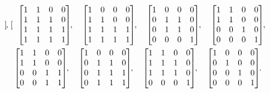 \documentclass[12pt]{amsart}
\theoremstyle{definition}
\numberwithin{equation}{section}
\newcommand{\ntksp}{\negthickspace}
\begin{document}
\begin{equation}
\begin{gathered}
\begin{bmatrix}
  \end{bmatrix}\ntksp,
  \quad
  \begin{bmatrix}
    1 & 1 & 0 & 0\\
    1 & 1 & 1 & 0\\
    1 & 1 & 1 & 1\\
    1 & 1 & 1 & 1
  \end{bmatrix}\ntksp,
  \quad
  \begin{bmatrix}
    1 & 0 & 0 & 0\\
    1 & 1 & 0 & 0\\
    1 & 1 & 1 & 1\\
    1 & 1 & 1 & 1
  \end{bmatrix}\ntksp,
  \quad
  \begin{bmatrix}
    1 & 0 & 0 & 0\\
    0 & 1 & 1 & 0\\
    0 & 1 & 1 & 0\\
    0 & 0 & 0 & 1
  \end{bmatrix}\ntksp,
  \quad
  \begin{bmatrix}
    1 & 1 & 0 & 0\\
    1 & 1 & 0 & 0\\
    0 & 0 & 1 & 0\\
    0 & 0 & 0 & 1
  \end{bmatrix}\ntksp,
  \\
  \begin{bmatrix}
    1 & 1 & 0 & 0\\
    1 & 1 & 0 & 0\\
    0 & 0 & 1 & 1\\
    0 & 0 & 1 & 1
  \end{bmatrix}\ntksp,
  \quad
  \begin{bmatrix}
    1 & 0 & 0 & 0\\
    0 & 1 & 1 & 0\\
    0 & 1 & 1 & 1\\
    0 & 1 & 1 & 1
  \end{bmatrix}\ntksp,
  \quad
  \begin{bmatrix}
    1 & 1 & 0 & 0\\
    1 & 1 & 1 & 0\\
    1 & 1 & 1 & 0\\
    0 & 0 & 0 & 1
  \end{bmatrix}\ntksp,
  \quad
  \begin{bmatrix}
    1 & 0 & 0 & 0\\
    0 & 1 & 0 & 0\\
    0 & 0 & 1 & 0\\
    0 & 0 & 0 & 1
  \end{bmatrix}\ntksp.
  \end{gathered}
\end{equation}
\end{document}
